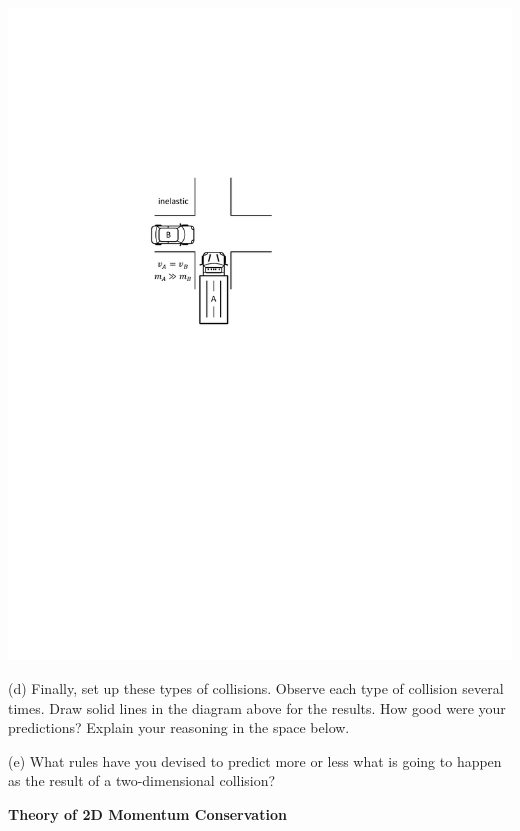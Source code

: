 \hspace{0.3in}
\includegraphics{twod_collisions/car_and_truck.pdf}


(d) Finally, set up these types of collisions. Observe each type of collision
several times. Draw solid lines in the diagram above for the results. How good
were your predictions? Explain your reasoning in the space below.
\answerspace{30mm}

(e) What rules have you devised to predict more or less what is going to happen
as the result of a two-dimensional collision?
\answerspace{15mm}

\pagebreak[3]
\textbf{Theory of 2D Momentum Conservation }

